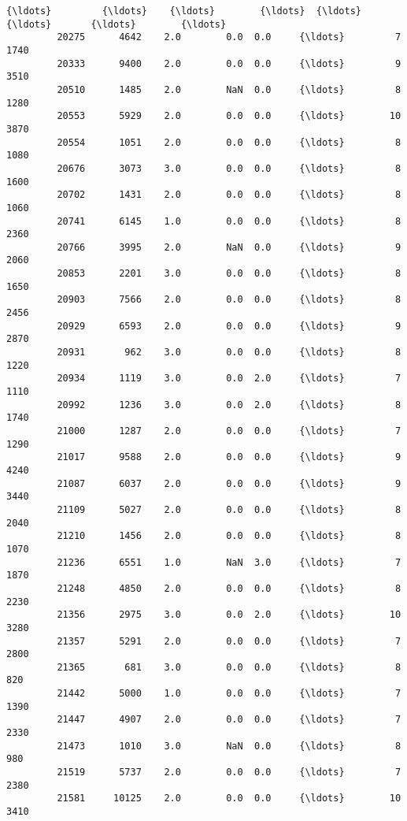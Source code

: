 \documentclass[11pt]{article}
\begin{document}
\begin{Verbatim}[commandchars=\\\{\}]
         {\ldots}         {\ldots}    {\ldots}        {\ldots}  {\ldots}     {\ldots}       {\ldots}        {\ldots}   
         20275      4642    2.0        0.0  0.0     {\ldots}         7       1740   
         20333      9400    2.0        0.0  0.0     {\ldots}         9       3510   
         20510      1485    2.0        NaN  0.0     {\ldots}         8       1280   
         20553      5929    2.0        0.0  0.0     {\ldots}        10       3870   
         20554      1051    2.0        0.0  0.0     {\ldots}         8       1080   
         20676      3073    3.0        0.0  0.0     {\ldots}         8       1600   
         20702      1431    2.0        0.0  0.0     {\ldots}         8       1060   
         20741      6145    1.0        0.0  0.0     {\ldots}         8       2360   
         20766      3995    2.0        NaN  0.0     {\ldots}         9       2060   
         20853      2201    3.0        0.0  0.0     {\ldots}         8       1650   
         20903      7566    2.0        0.0  0.0     {\ldots}         8       2456   
         20929      6593    2.0        0.0  0.0     {\ldots}         9       2870   
         20931       962    3.0        0.0  0.0     {\ldots}         8       1220   
         20934      1119    3.0        0.0  2.0     {\ldots}         7       1110   
         20992      1236    3.0        0.0  2.0     {\ldots}         8       1740   
         21000      1287    2.0        0.0  0.0     {\ldots}         7       1290   
         21017      9588    2.0        0.0  0.0     {\ldots}         9       4240   
         21087      6037    2.0        0.0  0.0     {\ldots}         9       3440   
         21109      5027    2.0        0.0  0.0     {\ldots}         8       2040   
         21210      1456    2.0        0.0  0.0     {\ldots}         8       1070   
         21236      6551    1.0        NaN  3.0     {\ldots}         7       1870   
         21248      4850    2.0        0.0  0.0     {\ldots}         8       2230   
         21356      2975    3.0        0.0  2.0     {\ldots}        10       3280   
         21357      5291    2.0        0.0  0.0     {\ldots}         7       2800   
         21365       681    3.0        0.0  0.0     {\ldots}         8        820   
         21442      5000    1.0        0.0  0.0     {\ldots}         7       1390   
         21447      4907    2.0        0.0  0.0     {\ldots}         7       2330   
         21473      1010    3.0        NaN  0.0     {\ldots}         8        980   
         21519      5737    2.0        0.0  0.0     {\ldots}         7       2380   
         21581     10125    2.0        0.0  0.0     {\ldots}        10       3410   
         

\end{Verbatim}
\end{document}
